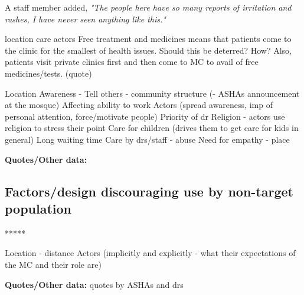A staff member added,
\textit{"The people here have so many reports of irritation and rashes, I have never seen anything like this."}

location
care
actors
Free treatment and medicines means that patients come to the clinic for the smallest of health issues. Should this be deterred? How? Also, patients visit private clinics first and then come to MC to avail of free medicines/tests. (quote)

Location
Awareness - Tell others - community structure (- ASHAs announcement at the mosque)
Affecting ability to work
Actors (spread awareness, imp of personal attention, force/motivate people)
Priority of dr
Religion - actors use religion to stress their point
Care for children (drives them to get care for kids in general)
Long waiting time
Care by drs/staff - abuse 
Need for empathy - place

\textbf{Quotes/Other data:}





\subsection{Factors/design discouraging use by non-target population}

*****

Location - distance
Actors (implicitly and explicitly - what their expectations of the MC and their role are)

\textbf{Quotes/Other data:}
quotes by ASHAs and drs
